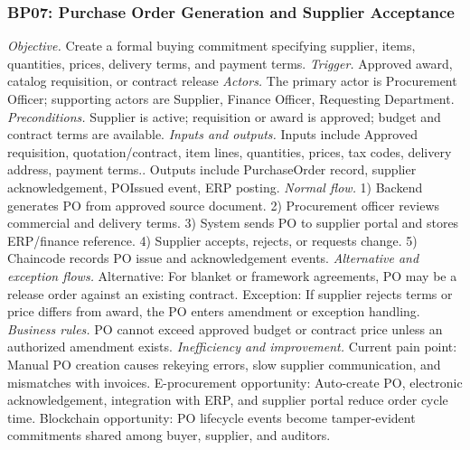 \documentclass[conference]{IEEEtran}
\begin{document}
\subsubsection{BP07: Purchase Order Generation and Supplier Acceptance}
\textit{Objective.} Create a formal buying commitment specifying supplier, items, quantities, prices, delivery terms, and payment terms.
\textit{Trigger.} Approved award, catalog requisition, or contract release
\textit{Actors.} The primary actor is Procurement Officer; supporting actors are Supplier, Finance Officer, Requesting Department.
\textit{Preconditions.} Supplier is active; requisition or award is approved; budget and contract terms are available.
\textit{Inputs and outputs.} Inputs include Approved requisition, quotation/contract, item lines, quantities, prices, tax codes, delivery address, payment terms.. Outputs include PurchaseOrder record, supplier acknowledgement, POIssued event, ERP posting.
\textit{Normal flow.} 1) Backend generates PO from approved source document. 2) Procurement officer reviews commercial and delivery terms. 3) System sends PO to supplier portal and stores ERP/finance reference. 4) Supplier accepts, rejects, or requests change. 5) Chaincode records PO issue and acknowledgement events.
\textit{Alternative and exception flows.} Alternative: For blanket or framework agreements, PO may be a release order against an existing contract. Exception: If supplier rejects terms or price differs from award, the PO enters amendment or exception handling.
\textit{Business rules.} PO cannot exceed approved budget or contract price unless an authorized amendment exists.
\textit{Inefficiency and improvement.} Current pain point: Manual PO creation causes rekeying errors, slow supplier communication, and mismatches with invoices. E-procurement opportunity: Auto-create PO, electronic acknowledgement, integration with ERP, and supplier portal reduce order cycle time. Blockchain opportunity: PO lifecycle events become tamper-evident commitments shared among buyer, supplier, and auditors.
\end{document}
